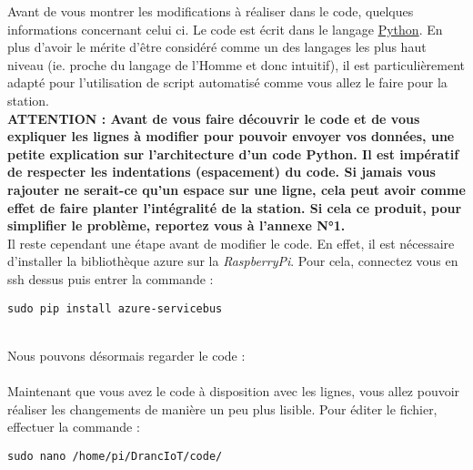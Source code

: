 Avant de vous montrer les modifications à réaliser dans le code, quelques informations concernant celui ci. Le code est écrit dans le langage \href{https://www.python.org/}{Python}. En plus d'avoir le mérite d'être considéré comme un des langages les plus haut niveau (ie. proche du langage de l'Homme et donc intuitif), il est particulièrement adapté pour l'utilisation de script automatisé comme vous allez le faire pour la station.\\

\textbf{ATTENTION : Avant de vous faire découvrir le code et de vous expliquer les lignes à modifier pour pouvoir envoyer vos données, une petite explication sur l'architecture d'un code Python. Il est impératif de respecter les indentations (espacement) du code. Si jamais vous rajouter ne serait-ce qu'un espace sur une ligne, cela peut avoir comme effet de faire planter l'intégralité de la station. Si cela ce produit, pour simplifier le problème, reportez vous à l'annexe N°1.}\\

Il reste cependant une étape avant de modifier le code. En effet, il est nécessaire d'installer la bibliothèque azure sur la \textit{RaspberryPi}. Pour cela, connectez vous en ssh dessus puis entrer la commande :\\

\begin{lstlisting}[style=MyBashStyle]
	sudo pip install azure-servicebus
\end{lstlisting}\\

Nous pouvons désormais regarder le code :\\ 
\newpage
{}\\

Maintenant que vous avez le code à disposition avec les lignes, vous allez pouvoir réaliser les changements de manière un peu plus lisible. Pour éditer le fichier, effectuer la commande :

\begin{lstlisting}[style=MyBashStyle]
	sudo nano /home/pi/DrancIoT/code/
\end{lstlisting}\\











	
	




